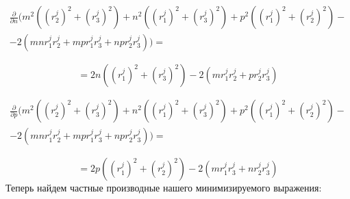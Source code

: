 \vspace{0.5cm}
$$\begin{gathered}
	\frac{\partial}{\partial n} \bigg( m^2 \left((r_2^j)^2 + (r_3^j)^2\right) + n^2 \left((r_1^j)^2 + (r_3^j)^2\right) + p^2 \left((r_1^j)^2 + (r_2^j)^2\right) - \\
	- 2 (m n r_1^j r_2^j + m p r_1^j r_3^j + n p r_2^j r_3^j) \bigg) = 
\end{gathered}$$

$$
	=  2 n \left((r_1^j)^2 + (r_3^j)^2\right) - 2 (m r_1^j r_2^j + p r_2^j r_3^j) 
$$

\vspace{0.5cm}
$$\begin{gathered}
	\frac{\partial}{\partial p} \bigg( m^2 \left((r_2^j)^2 + (r_3^j)^2\right) + n^2 \left((r_1^j)^2 + (r_3^j)^2\right) + p^2 \left((r_1^j)^2 + (r_2^j)^2\right) - \\
	- 2 (m n r_1^j r_2^j + m p r_1^j r_3^j + n p r_2^j r_3^j) \bigg) = 
\end{gathered}$$

$$
	= 2 p \left((r_1^j)^2 + (r_2^j)^2\right) - 2 (m r_1^j r_3^j + n r_2^j r_3^j)
$$
\hfill \break \hfill \break \hfill \break \hfill \break \hfill \break
\hfill \break \hfill \break
Теперь найдем частные производные нашего минимизируемого выражения:

